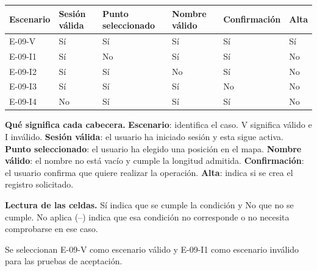 \begingroup\fontsize{7.8}{11}\selectfont\setlength{\tabcolsep}{3pt}
\begin{tabularx}{\linewidth}{@{}*{6}{Y}@{}}\toprule
\textbf{Escenario} & \textbf{Sesión válida} & \textbf{Punto seleccionado} & \textbf{Nombre válido} & \textbf{Confirmación} & \textbf{Alta}\\\midrule
E-09-V & Sí & Sí & Sí & Sí & Sí\\[3pt]
E-09-I1 & Sí & No & Sí & Sí & No\\[3pt]
E-09-I2 & Sí & Sí & No & Sí & No\\[3pt]
E-09-I3 & Sí & Sí & Sí & No & No\\[3pt]
E-09-I4 & No & Sí & Sí & Sí & No\\[3pt]
\bottomrule\end{tabularx}\endgroup\par
{\fontsize{9}{11}\selectfont\textbf{Qué significa cada cabecera.} \textbf{Escenario}: identifica el caso. V significa válido e I inválido. \textbf{Sesión válida}: el usuario ha iniciado sesión y esta sigue activa. \textbf{Punto seleccionado}: el usuario ha elegido una posición en el mapa. \textbf{Nombre válido}: el nombre no está vacío y cumple la longitud admitida. \textbf{Confirmación}: el usuario confirma que quiere realizar la operación. \textbf{Alta}: indica si se crea el registro solicitado.\par\textbf{Lectura de las celdas.} Sí indica que se cumple la condición y No que no se cumple. No aplica (--) indica que esa condición no corresponde o no necesita comprobarse en ese caso.\par}


Se seleccionan E-09-V como escenario válido y E-09-I1 como escenario inválido para las pruebas de aceptación.\par


